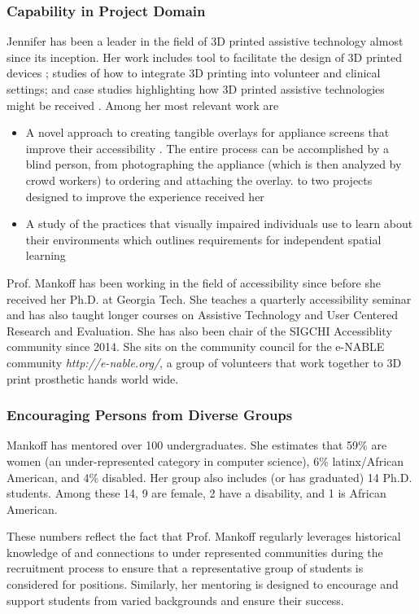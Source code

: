 \subsubsection{Capability in Project Domain}
Jennifer has been a leader in the field of 3D printed assistive technology almost since its inception. Her work includes tool to facilitate the design of 3D printed devices \cite{Hofmann:2016:HelpingHands,Chen:2016:Reprise}; studies of how to integrate 3D printing into volunteer \cite{Parry-Hill:2017:Fabricators5} and clinical \cite{Hofmann:2016:Clinical} settings; and case studies highlighting how 3D printed assistive technologies might be received \cite{Hofmann:2016:HelpingHands}. Among her most relevant work are 
\begin{itemize}
    \item  A novel approach to creating tangible overlays for appliance screens that improve their accessibility \cite{Guo:2017:Facade}. The entire process can be accomplished by a blind person, from photographing the appliance (which is then analyzed by crowd workers) to ordering and attaching the overlay.  to two projects designed to improve the experience received her 
\item A study of the practices that visually impaired individuals use to learn about their environments which outlines requirements for independent spatial learning \cite{Banovic:2013:spatial}
\end{itemize}

Prof. Mankoff has been working in the field of accessibility since before she received her Ph.D.  at Georgia Tech. She teaches a quarterly accessibility seminar and has also taught longer courses on Assistive Technology and User Centered Research and Evaluation. She has also been chair of the SIGCHI Accessiblity community since 2014. She sits on the community council for the e-NABLE community \textit{http://e-nable.org/}, a group of volunteers that work together to 3D print prosthetic hands world wide.

\subsubsection{Encouraging Persons from Diverse Groups}
Mankoff has mentored over 100
undergraduates. She estimates that 59\% are women (an under-represented category in computer science), 6\% latinx/African American, and 4\% disabled. Her group also includes (or has graduated) 14 Ph.D. students. Among these 14, 9 are female, 2 have a disability, and 1 is African American. 

These numbers reflect the fact that Prof. Mankoff regularly  leverages  historical knowledge of and connections to under
represented communities during the recruitment process to ensure that a representative group of students is considered for  positions. Similarly, her mentoring is designed to encourage and support students from varied backgrounds and ensure their success. 

